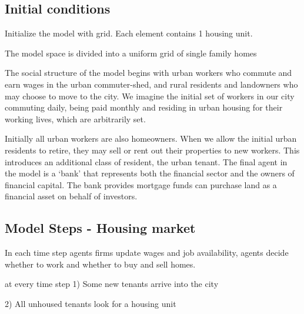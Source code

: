 \subsection{Initial conditions}
Initialize the model with grid. Each element contains 1 housing unit.

The model space is divided into a uniform grid of single family homes %

The social structure of the model begins with urban workers who commute and earn wages in the urban commuter-shed, and rural residents and landowners who may choose to move to the city. 
We imagine the initial set of workers in our city commuting daily, being paid monthly and residing in urban housing for their working lives, which are arbitrarily set. 

Initially all urban workers are also homeowners. When we allow the initial urban residents to retire, they may sell or rent out their properties to new workers. This introduces an additional \gls{class} of resident, the urban tenant. The final agent in the model is a `bank' that represents both the financial sector and the owners of financial capital. The bank provides mortgage funds can %
purchase land as a financial asset on behalf of investors.

\subsection{Model Steps - Housing market}
In each time step agents firms update wages and job availability, agents decide whether to work and whether to buy and sell homes.

at every time step 
    1) Some new tenants arrive into the city
    
    2) All unhoused tenants look for a housing unit 
    
